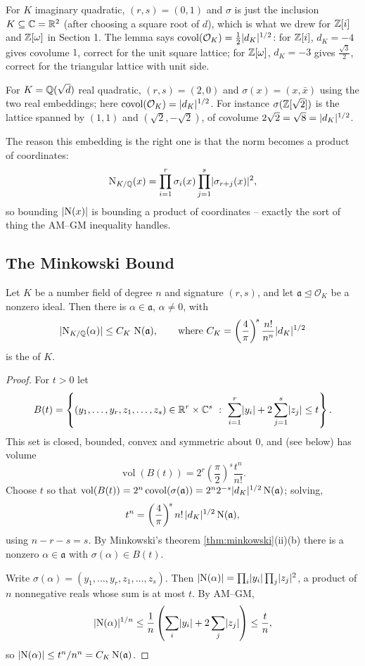 \documentclass[a4paper]{scrartcl}
\renewcommand{\OO}{\mathcal{O}}
\newcommand{\Nm}{\operatorname{N}}
\newcommand{\vol}{\operatorname{vol}}
\newcommand{\covol}{\operatorname{covol}}
\newcommand{\fa}{\mathfrak{a}}
\begin{document}
\begin{example}
	For $K$ imaginary quadratic, $(r,s) = (0,1)$ and $\sigma$ is just the inclusion $K \subseteq \mathbb{C} = \mathbb{R}^2$ (after choosing a square root of $d$), which is what we drew for $\mathbb{Z}[i]$ and $\mathbb{Z}[\omega]$ in Section 1. The lemma says $\covol(\OO_K) = \tfrac12\abs{d_K}^{1/2}$: for $\mathbb{Z}[i]$, $d_K = -4$ gives covolume $1$, correct for the unit square lattice; for $\mathbb{Z}[\omega]$, $d_K=-3$ gives $\tfrac{\sqrt3}{2}$, correct for the triangular lattice with unit side.

	For $K = \mathbb{Q}(\sqrt d)$ real quadratic, $(r,s) = (2,0)$ and $\sigma(x) = (x, \bar x)$ using the two real embeddings; here $\covol(\OO_K) = \abs{d_K}^{1/2}$. For instance $\sigma(\mathbb{Z}[\sqrt2])$ is the lattice spanned by $(1,1)$ and $(\sqrt2,-\sqrt2)$, of covolume $2\sqrt2 = \sqrt 8 = \lvert d_K\rvert^{1/2}$.
\end{example}

The reason this embedding is the right one is that the norm becomes a product of coordinates:
$$\Nm_{K/\Q}(x) = \prod_{i=1}^r\sigma_i(x)\prod_{j=1}^s\abs{\sigma_{r+j}(x)}^2,$$
so bounding $\abs{\Nm(x)}$ is bounding a product of coordinates -- exactly the sort of thing the AM--GM inequality handles.

\subsection{The Minkowski Bound}

\begin{proposition}\label{prop:minkbound}
	Let $K$ be a number field of degree $n$ and signature $(r,s)$, and let $\fa \trianglelefteq \OO_K$ be a nonzero ideal. Then there is $\alpha \in \fa$, $\alpha \neq 0$, with
	$$\abs{\Nm_{K/\Q}(\alpha)} \le C_K\,\Nm(\fa), \qquad \text{where } C_K = \left(\frac4\pi\right)^{\!s}\frac{n!}{n^n}\abs{d_K}^{1/2}$$
	is the  of $K$.
\end{proposition}

\begin{proof}
	For $t > 0$ let
	$$B(t) = \left\{(y_1,\dots,y_r,z_1,\dots,z_s) \in \R^r\times\C^s\ :\ \sum_{i=1}^r\abs{y_i} + 2\sum_{j=1}^s\abs{z_j} \le t\right\}.$$
	This set is closed, bounded, convex and symmetric about $0$, and (see below) has volume
	$$\vol(B(t)) = 2^r\left(\frac\pi2\right)^{\!s}\frac{t^n}{n!}.$$
	Choose $t$ so that $\vol(B(t)) = 2^n\covol(\sigma(\fa)) = 2^n2^{-s}\abs{d_K}^{1/2}\Nm(\fa)$; solving,
	$$t^n = \left(\frac4\pi\right)^{\!s}n!\,\abs{d_K}^{1/2}\Nm(\fa),$$
	using $n - r - s = s$. By Minkowski's theorem \ref{thm:minkowski}(ii)(b) there is a nonzero $\alpha \in \fa$ with $\sigma(\alpha) \in B(t)$.

	Write $\sigma(\alpha) = (y_1,\dots,y_r,z_1,\dots,z_s)$. Then $\abs{\Nm(\alpha)} = \prod_i\abs{y_i}\prod_j\abs{z_j}^2$, a product of $n$ nonnegative reals whose sum is at most $t$. By AM--GM,
	$$\abs{\Nm(\alpha)}^{1/n} \le \frac1n\left(\sum_i\abs{y_i}+2\sum_j\abs{z_j}\right)\le\frac tn,$$
	so $\abs{\Nm(\alpha)} \le t^n/n^n = C_K\Nm(\fa)$.
\end{proof}
\end{document}
